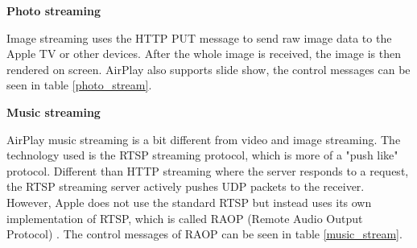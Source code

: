 \textbf{Photo streaming}

Image streaming uses the HTTP PUT message to send raw image data to the Apple TV
or other devices. After the whole image is received, the image is then rendered on 
screen. AirPlay also supports slide show, the control messages can be seen in 
table \ref{photo_stream}.

\begin{table}[htb] 
\caption{AirPlay Photo Control HTTP requests \label{photo_stream}} 
\begin{center} 
\end{center} 
\end{table} 

\textbf{Music streaming}

AirPlay music streaming is a bit different from video and image streaming. The 
technology used is the RTSP streaming protocol, which is more of a "push like"
protocol. Different than HTTP streaming where the server responds to a request,
the RTSP streaming server actively pushes UDP packets to the receiver. However,
Apple does not use the standard RTSP but instead uses its own implementation of
RTSP, which is called RAOP (Remote Audio Output Protocol) \cite{AirPlay-spec}.
The control messages of RAOP can be seen in table \ref{music_stream}.

\begin{table}[htb] 
\caption{AirPlay Audio Control RTSP requests \label{music_stream}} 
\begin{center} 
\end{center} 
\end{table} 

